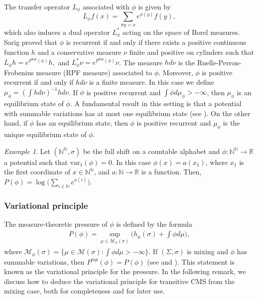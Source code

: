 \documentclass[letterpaper,11pt]{amsart}
\theoremstyle{plain}
\theoremstyle{plain}
\theoremstyle{definition}
\theoremstyle{remark}
\newtheorem{example}{Example}
\def\R{{\mathbb R}}
\def\N{{\mathbb N}}
\def\M{{\mathcal M}}
\begin{document}
The transfer operator $L_\phi$ associated with $\phi$ is given by $$L_\phi f(x)=\sum_{\sigma y=x} e^{\phi(y)}f(y),$$ which also induces a dual operator $L_\phi^*$ acting on the space of Borel measures. Sarig \cite{sa1,sa3} proved that $\phi$ is recurrent if and only if there exists a positive continuous function $h$ and a conservative measure $\nu$ finite and positive on cylinders such that $L_\phi h=e^{P^{top}(\phi)}h,$ and $L^*_\phi \nu=e^{P^{top}(\phi)}\nu$.  The measure $hd\nu$ is the Ruelle-Perron-Frobenius measure (RPF measure) associated to $\phi$.  Moreover, $\phi$ is positive recurrent if and only if $hd\nu$ is a finite measure. In this case we define $\mu_\phi=(\int hd\nu)^{-1}hd\nu$. If $\phi$ is positive recurrent and $\int \phi d\mu_\phi>-\infty$, then $\mu_\phi$ is an equilibrium state of $\phi$. A fundamental result in this setting is that a potential with summable variations has at most one equilibrium state (see \cite[Theorem 1.2]{bs}). On the other hand, if $\phi$ has an equilibrium state, then $\phi$ is positive recurrent and $\mu_\phi$ is the unique equilibrium state of $\phi$. 

\begin{example}\label{ex:full} Let $(\N^\N,\sigma)$ be the full shift on a countable alphabet and $\phi:\N^\N\to\R$ a potential such that $\text{var}_1(\phi)=0$. In this case $\phi(x)=a(x_1)$, where $x_1$ is the first coordinate of $x\in \N^\N$, and $a:\N\to\R$ is a function. Then,
$P(\phi)=\log\big(\sum_{i\in \N}e^{a(i)}\big).$
\end{example}

\subsubsection{Variational principle} The measure-theoretic pressure of $\phi$ is defined by the formula
\begin{align*} P(\phi)=\sup_{\mu\in \M_\phi(\sigma)}\bigg(h_\mu(\sigma)+\int \phi d\mu\bigg),\end{align*}
where $\M_\phi(\sigma)=\{\mu\in\M(\sigma): \int \phi d\mu>-\infty\}$. If $(\Sigma,\sigma)$ is mixing and $\phi$ has summable variations, then $P^{top}(\phi)=P(\phi)$ (see \cite[Theorem 3]{sa1} and \cite[Theorem 2.10]{ijt}). This statement is known as the variational principle for the pressure. In the following remark, we discuss how to deduce the variational principle for transitive CMS from the mixing case, both for completeness and for later use.
\end{document}
